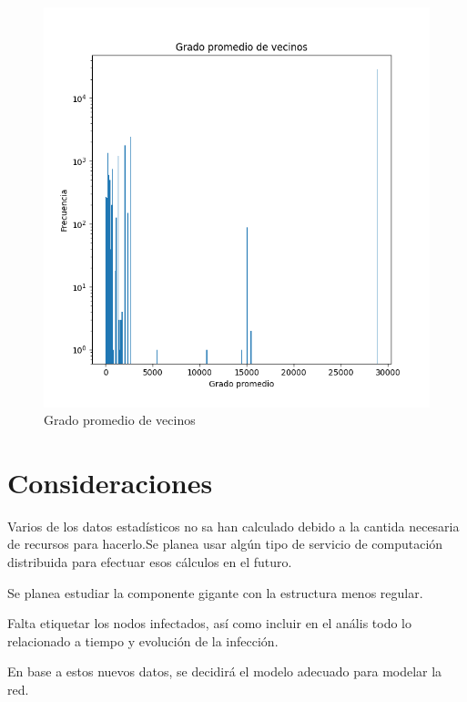 \documentclass{article}
\begin{document}
    \begin{figure}
        \centering
        \includegraphics[scale=0.75]{avg_nei_degree.png}
        \caption{Grado promedio de vecinos}
        \label{fig:degeavgnei}
    \end{figure}

    \section*{Consideraciones}

    Varios de los datos estadísticos no sa han calculado debido a la cantida 
    necesaria de recursos para hacerlo.Se planea usar algún tipo de servicio 
    de computación distribuida para efectuar esos cálculos en el futuro.

    Se planea estudiar la componente gigante con  la estructura menos regular.

    Falta etiquetar los nodos infectados, así como incluir en el anális todo lo 
    relacionado a tiempo y evolución de la infección.
    
    En base a estos nuevos datos, se decidirá el modelo adecuado para modelar la
    red.
\end{document}
